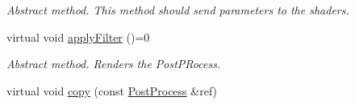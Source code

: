 \begin{DoxyCompactItemize}
\begin{DoxyCompactList}\small\item\em Abstract method. This method should send parameters to the shaders. \end{DoxyCompactList}\item 
\mbox{\label{class_geometry_engine_1_1_geometry_post_process_1_1_post_process_acbd697b4103a9e8c897b8c073350e5a2}} 
virtual void \mbox{\hyperlink{class_geometry_engine_1_1_geometry_post_process_1_1_post_process_acbd697b4103a9e8c897b8c073350e5a2}{apply\+Filter}} ()=0
\begin{DoxyCompactList}\small\item\em Abstract method. Renders the Post\+P\+Rocess. \end{DoxyCompactList}\item 
virtual void \mbox{\hyperlink{class_geometry_engine_1_1_geometry_post_process_1_1_post_process_aba093c175b228894204e785a5a54e6e9}{copy}} (const \mbox{\hyperlink{class_geometry_engine_1_1_geometry_post_process_1_1_post_process}{Post\+Process}} \&ref)
\end{DoxyCompactItemize}
